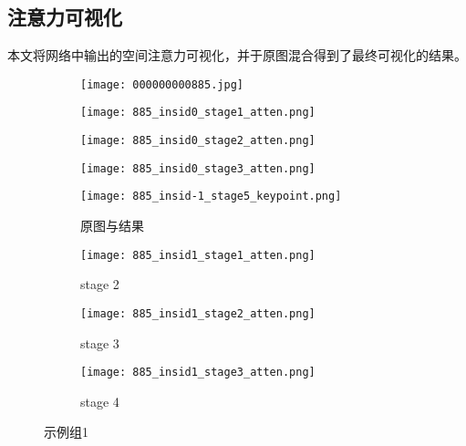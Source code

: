 \subsection{注意力可视化}
\label{sec:weaksuperatten}
本文将网络中输出的空间注意力可视化，并于原图混合得到了最终可视化的结果。
\label{subsec:attenexp}
\begin{figure*}
	\centering
	\begin{minipage}{\textwidth}
		\centering
		\begin{subfigure}{0.23\linewidth}
		\texttt{[image: 000000000885.jpg]}
		\end{subfigure}
		\begin{subfigure}{0.23\linewidth}
		\texttt{[image: 885\_insid0\_stage1\_atten.png]}
		\end{subfigure}
		\begin{subfigure}{0.23\linewidth}
		\texttt{[image: 885\_insid0\_stage2\_atten.png]}
		\end{subfigure}
		\begin{subfigure}{0.23\linewidth}
		\texttt{[image: 885\_insid0\_stage3\_atten.png]}
		\end{subfigure}
		\begin{sideways}
		\begin{minipage}{1cm}
		\end{minipage}
		\end{sideways}
	\end{minipage}

	\vskip2pt
	\begin{minipage}{\textwidth}
		\centering
		\begin{subfigure}{0.23\linewidth}
			\texttt{[image: 885\_insid-1\_stage5\_keypoint.png]}
			\caption{原图与结果}
		\end{subfigure}
		\begin{subfigure}{0.23\linewidth}
			\texttt{[image: 885\_insid1\_stage1\_atten.png]}
			\caption{stage 2}
		\end{subfigure}
		\begin{subfigure}{0.23\linewidth}
			\texttt{[image: 885\_insid1\_stage2\_atten.png]}
			\caption{stage 3}
		\end{subfigure}
		\begin{subfigure}{0.23\linewidth}
			\texttt{[image: 885\_insid1\_stage3\_atten.png]}
			\caption{stage 4}
		\end{subfigure}
		\begin{sideways}
			\begin{minipage}{1cm}
				\rightline{被遮挡人}
			\end{minipage}
		\end{sideways}
	\end{minipage}
	\label{fig:parallel1}
	\caption{示例组1}
\end{figure*}

